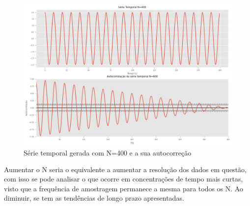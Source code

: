 \documentclass[12pt,a4paper,portuguese]{article}
\begin{document}
\begin{figure}[H]
	\centering
	\includegraphics[width=1\linewidth]{lista3-5-400}
	\caption{Série temporal gerada com N=400 e a sua autocorreção }
	\label{fig:lista3-5-400}
\end{figure} 
Aumentar o N seria o equivalente a aumentar a resolução dos dados em questão, com isso se pode analisar o que ocorre em concentrações de tempo mais curtas, visto que a frequência de amostragem permanece a mesma para todos os N. Ao diminuir, se tem as tendências de longo prazo apresentadas. 
\end{document}
